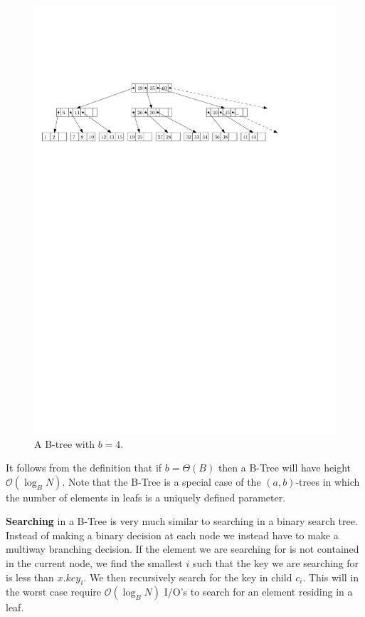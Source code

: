 \documentclass[twoside,11pt,openright]{report}
\begin{document}
\begin{figure}[h]
	\centering
	\includegraphics[width=\textwidth]{../figures/b-tree}
	\caption{A B-tree with $b = 4$.}
	\label{fig:b-tree}
\end{figure}

It follows from the definition that if $b=\Theta(B)$ then a B-Tree will have height $\mathcal{O}(\log_B N)$. Note that the B-Tree is a special case of the $(a,b)$-trees in which the number of elements in leafs is a uniquely defined parameter.

\textbf{Searching} in a B-Tree is very much similar to searching in a binary search tree. Instead of making a binary decision at each node we instead have to make a multiway branching decision. If the element we are searching for is not contained in the current node, we find the smallest $i$ such that the key we are searching for is less than $x.key_i$. We then recursively search for the key in child $c_i$. This will in the worst case require $\mathcal{O}(\log_B N)$ I/O's to search for an element residing in a leaf.
\end{document}
